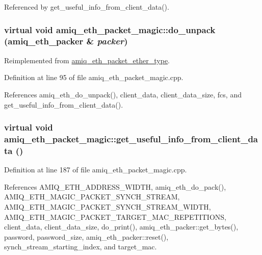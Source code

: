 Referenced by get\_\-useful\_\-info\_\-from\_\-client\_\-data().\hypertarget{classamiq__eth__packet__magic_a400a90ae523af44eb0c38ba64ea6afe7}{
\subsubsection[{do\_\-unpack}]{\setlength{\rightskip}{0pt plus 5cm}virtual void amiq\_\-eth\_\-packet\_\-magic::do\_\-unpack ({\bf amiq\_\-eth\_\-packer} \& {\em packer})}}
\label{classamiq__eth__packet__magic_a400a90ae523af44eb0c38ba64ea6afe7}


Reimplemented from \hyperlink{classamiq__eth__packet__ether__type_a0c86ef80c46bbed384739b23e5efb0ef}{amiq\_\-eth\_\-packet\_\-ether\_\-type}.

Definition at line 95 of file amiq\_\-eth\_\-packet\_\-magic.cpp.

References amiq\_\-eth\_\-do\_\-unpack(), client\_\-data, client\_\-data\_\-size, fcs, and get\_\-useful\_\-info\_\-from\_\-client\_\-data().\hypertarget{classamiq__eth__packet__magic_aa9451a4b2d3566114694bd4a578759da}{
\subsubsection[{get\_\-useful\_\-info\_\-from\_\-client\_\-data}]{\setlength{\rightskip}{0pt plus 5cm}virtual void amiq\_\-eth\_\-packet\_\-magic::get\_\-useful\_\-info\_\-from\_\-client\_\-data ()}}
\label{classamiq__eth__packet__magic_aa9451a4b2d3566114694bd4a578759da}


Definition at line 187 of file amiq\_\-eth\_\-packet\_\-magic.cpp.

References AMIQ\_\-ETH\_\-ADDRESS\_\-WIDTH, amiq\_\-eth\_\-do\_\-pack(), AMIQ\_\-ETH\_\-MAGIC\_\-PACKET\_\-SYNCH\_\-STREAM, AMIQ\_\-ETH\_\-MAGIC\_\-PACKET\_\-SYNCH\_\-STREAM\_\-WIDTH, AMIQ\_\-ETH\_\-MAGIC\_\-PACKET\_\-TARGET\_\-MAC\_\-REPETITIONS, client\_\-data, client\_\-data\_\-size, do\_\-print(), amiq\_\-eth\_\-packer::get\_\-bytes(), password, password\_\-size, amiq\_\-eth\_\-packer::reset(), synch\_\-stream\_\-starting\_\-index, and target\_\-mac.

